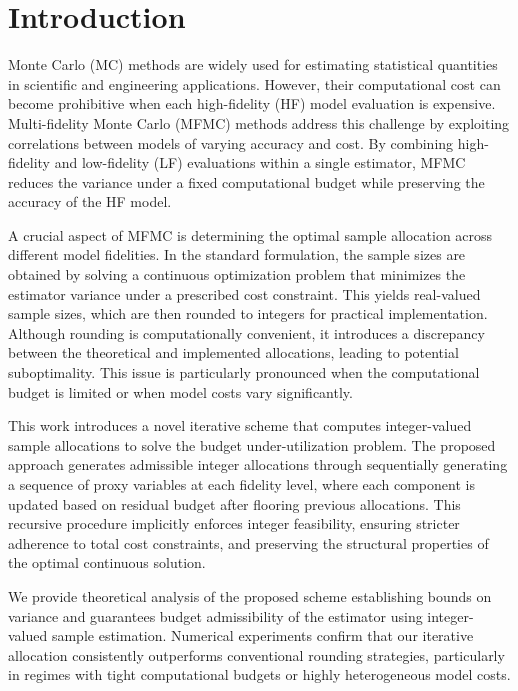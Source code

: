 \section{Introduction}\label{sec:Intro}

Monte Carlo (MC) methods are widely used for estimating statistical quantities in scientific and engineering applications. However, their computational cost can become prohibitive when each high-fidelity (HF) model evaluation is expensive. Multi-fidelity Monte Carlo (MFMC) methods \cite{PeWiGu:2016} address this challenge by exploiting correlations between models of varying accuracy and cost. By combining high-fidelity and low-fidelity (LF) evaluations within a single estimator, MFMC reduces the variance under a fixed computational budget while preserving the accuracy of the HF model.


A crucial aspect of MFMC is determining the optimal sample allocation across different model fidelities. In the standard formulation, the sample sizes are obtained by solving a continuous optimization problem that minimizes the estimator variance under a prescribed cost constraint. This yields real-valued sample sizes, which are then rounded to integers for practical implementation. Although rounding is computationally convenient, it introduces a discrepancy between the theoretical and implemented allocations, leading to potential suboptimality. This issue is particularly pronounced when the computational budget is limited or when model costs vary significantly.


This work introduces a novel iterative scheme that computes integer-valued sample allocations to solve the budget under-utilization problem. The proposed approach generates admissible integer allocations through sequentially generating a sequence of proxy variables at each fidelity level, where each component is updated based on residual budget after flooring previous allocations. This recursive procedure implicitly enforces integer feasibility,  ensuring stricter adherence to total cost constraints, and preserving the structural properties of the optimal continuous solution.



We provide theoretical analysis of the proposed scheme establishing bounds on variance and guarantees budget admissibility of the estimator using integer-valued sample estimation. Numerical experiments confirm that our iterative allocation consistently outperforms conventional rounding strategies, particularly in regimes with tight computational budgets or highly heterogeneous model costs.

